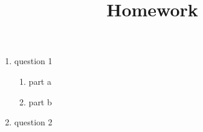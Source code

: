 \documentclass[12pt]{article}
\title{Homework}
\begin{document}
\doublespacing

\begin{enumerate}

\item[1.] question 1
\begin{enumerate} 
\item[a)] part a
\item[b)] part b
\end{enumerate}
\item[2.] question 2
\end{enumerate}
\end{document}
